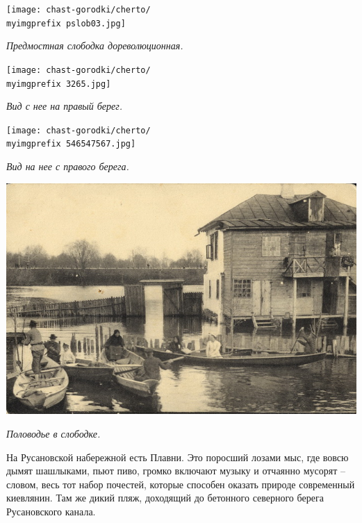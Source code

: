 \vspace*{\fill}
\newpage
\vspace*{\fill}
\begin{center}
\texttt{[image: chast-gorodki/cherto/\\myimgprefix pslob03.jpg]}

\textit{Предмостная слободка дореволюционная.}
\end{center}


\begin{center}
\texttt{[image: chast-gorodki/cherto/\\myimgprefix 3265.jpg]}

\textit{Вид с нее на правый берег.}
\end{center}
\vspace*{\fill}
\newpage
\vspace*{\fill}
\begin{center}
\texttt{[image: chast-gorodki/cherto/\\myimgprefix 546547567.jpg]}

\textit{Вид на нее с правого берега.}
\end{center}

\begin{center}
\includegraphics[width=\linewidth]{chast-gorodki/cherto/predmost.jpg}

\textit{Половодье в слободке.}
\end{center}
\vspace*{\fill}
\newpage

На Русановской набережной есть Плавни. Это поросший лозами мыс, где вовсю дымят шашлыками, пьют пиво, громко включают музыку и отчаянно мусорят – словом, весь тот набор почестей, которые способен оказать природе современный киевлянин. Там же дикий пляж, доходящий до бетонного северного берега Русановского канала. 


